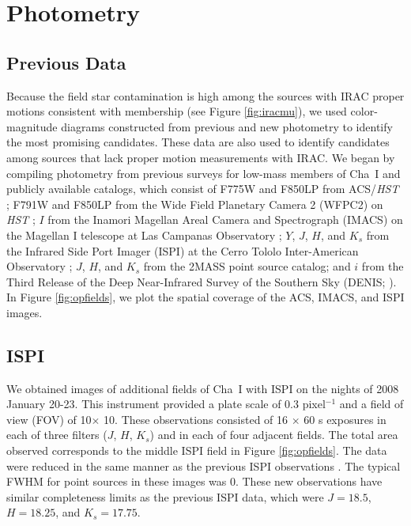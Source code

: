 \documentclass{emulateapj}
\begin{document}
\section{Photometry}
\label{sec:phot}
\subsection{Previous Data}

Because the field star contamination is high among the sources with IRAC proper motions 
consistent with membership (see Figure \ref{fig:iracmu}),
we used color-magnitude diagrams constructed from
previous and new photometry to identify the most promising candidates. 
These data are also used to identify candidates among sources that lack
proper motion measurements with IRAC. We began by compiling photometry from 
previous surveys for low-mass members of Cha~I and publicly available catalogs,
which consist of F775W and F850LP from ACS/{\it HST}
\citep[see Section \ref{sec:acspm};][]{luh05}; F791W and F850LP from the
Wide Field Planetary Camera 2 (WFPC2) on {\it HST} \citep{tod14};
$I$ from the Inamori Magellan Areal Camera and Spectrograph (IMACS) 
on the Magellan I telescope at Las Campanas Observatory \citep{luhm07};
$Y$, $J$, $H$, and $K_s$ from the Infrared Side Port Imager (ISPI)
at the Cerro Tololo Inter-American Observatory \citep[CTIO;][]{luh05};
$J$, $H$, and $K_s$ from the 2MASS point source catalog;
and $i$ from the Third Release of the 
Deep Near-Infrared Survey of the Southern Sky (DENIS; \citealt{epc99}).
In Figure \ref{fig:opfields}, 
we plot the spatial coverage of the ACS, IMACS, and ISPI images.

\subsection{ISPI}
We obtained images of additional fields of Cha~I with ISPI on the nights of 2008 January 20-23.
This instrument provided a plate scale of 0.3 pixel$^{-1}$ and a field of view (FOV) of
10$\times$ 10.
These observations consisted of 16 $\times$ 60 s exposures in each of three filters ($J$, $H$, $K_s$)
and in each of four adjacent fields. 
The total area observed corresponds to the middle ISPI field in Figure \ref{fig:opfields}.
The data were reduced in the same manner as the previous ISPI observations \citep{luh05,luhm07}.
The typical FWHM for point sources in these images was 0.
These new observations have similar completeness limits as the previous ISPI data, 
which were $J=18.5$, $H=18.25$, and $K_s=17.75$.
\end{document}
